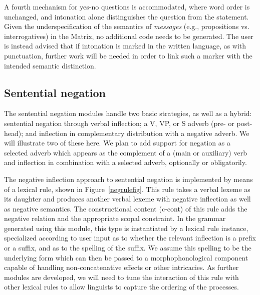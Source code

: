 A fourth mechanism for yes-no questions is accommodated, where word order is
unchanged, and intonation alone distinguishes the question from the statement.
Given the underspecification of the semantics of {\it messages} (e.g.,
propositions vs. interrogatives) in the Matrix, no additional code needs to
be generated.  The user is instead advised that if intonation is marked in 
the written language, as with punctuation, further work will be needed in order
to link such a marker with the intended semantic distinction.

\subsection{Sentential negation}

The sentential negation modules handle two basic strategies, as well
as a hybrid: sentential negation through verbal inflection; a V,
VP, or S adverb (pre- or post-head); and inflection in complementary
distribution with a negative adverb. We will illustrate two of these
here.  We plan to add support for negation as a
selected adverb which appears as the complement of a (main or auxiliary) verb 
and inflection in combination with a selected adverb,
optionally or obligatorily.

The negative inflection approach to sentential negation is implemented
by means of a lexical rule, shown in Figure~\ref{negrulefig}.  This
rule takes a verbal lexeme as its daughter and produces another verbal
lexeme with negative inflection as well as negative semantics.  The
constructional content ({\sc c-cont}) of this rule adds the negative
relation and the appropriate scopal constraint.
In the grammar generated using this module,
this type is instantiated by a lexical rule instance, specialized
according to user input as to whether the relevant inflection is a
prefix or a suffix, and as to the spelling of the suffix.  We assume
this spelling to be the underlying form which can then be passed to a
morphophonological component capable of handling non-concatenative
effects or other intricacies.  As further modules are developed, we
will need to tune the interaction of this rule with other lexical
rules to allow linguists to capture the ordering of the
processes.

